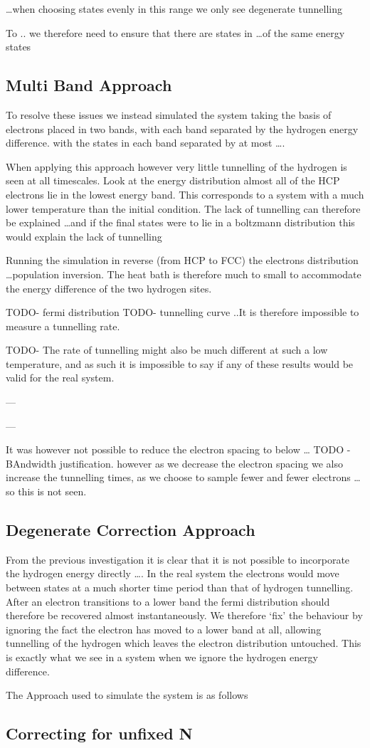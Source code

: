\ldots when choosing states evenly in this
range we only see degenerate tunnelling



To .. we therefore need to ensure that
there are states in \ldots of the same energy
states

\subsection{Multi Band Approach}
To resolve these issues we instead simulated the system
taking the basis of electrons placed in two bands,
with each band separated by the hydrogen energy
difference.
with
the states in each band separated by at most \ldots.


When applying this approach however very
little tunnelling of the hydrogen is seen at all timescales.
Look at the energy distribution almost all
of the HCP electrons lie in the lowest energy band.
This corresponds to a system with a much lower
temperature than the initial condition.
The lack of tunnelling can therefore be explained
\ldots and if
the final states were to lie in a boltzmann  distribution
this would explain the lack of tunnelling

Running the simulation
in reverse (from HCP to FCC) the electrons
distribution \ldots population inversion.
The heat bath is therefore much to small
to accommodate the energy difference of
the two hydrogen sites.

TODO- fermi distribution
TODO- tunnelling curve
..It is therefore impossible to measure a tunnelling
rate.

TODO- The rate of tunnelling might also
be much different at such a low temperature,
and as such it is impossible to say if
any of these results would be valid
for the real system.


---

---

It was however not possible to
reduce the electron spacing to
below \ldots
TODO -BAndwidth justification.
however as we decrease the electron
spacing we also increase the tunnelling
times, as we choose to sample fewer and
fewer electrons \ldots so this is not seen.


\subsection{Degenerate Correction Approach}
From the previous investigation it is clear
that it is not possible to incorporate the
hydrogen energy directly \ldots. In the
real system the electrons would move
between states at a much shorter time
period than that of hydrogen tunnelling.
After an electron transitions to a lower
band the fermi distribution should therefore
be recovered almost instantaneously. We
therefore `fix' the behaviour by
ignoring the fact the electron
has moved to a lower band at all,
allowing tunnelling of the hydrogen
which leaves the electron distribution
untouched. This is exactly what
we see in a system when we ignore
the hydrogen energy difference.


The Approach used to simulate the system is as follows

\subsection{Correcting for unfixed N}